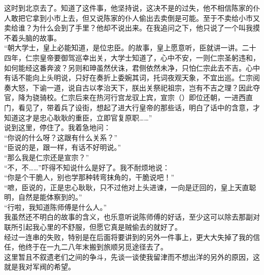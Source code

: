 这时到北京去了。知道了这件事，他坚持说，这决不是的过失，他不相信陈家的仆人敢把它拿到小市上去，但又说陈家的仆人偷出去卖倒是可能。至于不卖给小市又卖给谁？为什么会到了手里？他却不说出来。在我追问之下，他只说了一个叫我摸不着头脑的故事。\\

“朝大学士，皇上必能知道，是位忠臣。的故事，皇上愿意听，臣就讲一讲。二十四年，仁宗皇帝要御驾巡幸出关，大学士知道了，心中不安，一则仁宗圣躬违和，如何能经这番奔波？另则和珅虽然伏诛，君侧依然未净，只怕仁宗此去不吉。心中有话不能向上头明说，只好在奏折上委婉其词，托词夜观天象，不宜出巡。仁宗阅奏大怒，下谕一道，说自古以孝治天下，朕出关祭祀祖宗，岂有不吉之理？因此夺官，降为骁骑校。仁宗后来在热河行宫龙驭上宾，宣宗（）即位还朝，一进西直门，看见了，带着兵了设街，想起了进大行皇帝的那些话，明白了话中的含意，才知道这才是忠心耿耿的重臣，立即官复原职……”\\

说到这里，停住了。我着急地问：\\

“你说的什么呀？这跟有什么关系？”\\

“臣说的是，跟一样，有话不好明说。”\\

“那么我是仁宗还是宣宗？”\\

“不，不……”吓得不知说什么是好了。我不耐烦地说：\\

“你是个干脆人，别也学那种转弯抹角的，干脆说吧！”\\

“嗻，臣说的，正是忠心耿耿，只不过他对上头进谏，一向是迂回的，皇上天直聪明，自然是能体察到的。”\\

“行啦，我知道陈师傅是什么人。”\\

我虽然还不明白的故事的含义，也乐意听说陈师傅的好话，至少这可以除去那副对联所引起我心里的不舒服，但愿它真是贼偷去的就好了。\\

经过一连串的失败，特别是在后面将要讲到的另外一件事上，更大大失掉了我的信任，他终于在一九二八年末搬到旅顺另觅途径去了。\\

这里暂且不叙遗老们之间的争斗，先谈一谈使我留津而不想出洋的另外的原因，这就是我对军阀的希望。
